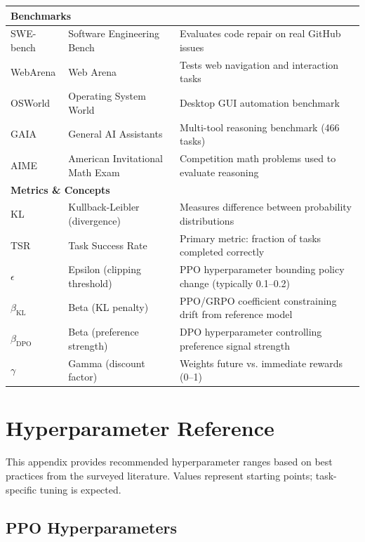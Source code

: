 \documentclass[12pt,a4paper]{report}
\theoremstyle{definition}
\begin{document}
\begin{longtable}{@{}p{2.5cm}p{5cm}p{7cm}@{}}
\multicolumn{3}{l}{\textbf{Benchmarks}} \\
\midrule
SWE-bench & Software Engineering Bench & Evaluates code repair on real GitHub issues \\
WebArena & Web Arena & Tests web navigation and interaction tasks \\
OSWorld & Operating System World & Desktop GUI automation benchmark \\
GAIA & General AI Assistants & Multi-tool reasoning benchmark (466 tasks) \\
AIME & American Invitational Math Exam & Competition math problems used to evaluate reasoning \\
\midrule

\multicolumn{3}{l}{\textbf{Metrics \& Concepts}} \\
\midrule
KL & Kullback-Leibler (divergence) & Measures difference between probability distributions \\
TSR & Task Success Rate & Primary metric: fraction of tasks completed correctly \\
$\epsilon$ & Epsilon (clipping threshold) & PPO hyperparameter bounding policy change (typically 0.1--0.2) \\
$\beta_{\text{KL}}$ & Beta (KL penalty) & PPO/GRPO coefficient constraining drift from reference model \\
$\beta_{\text{DPO}}$ & Beta (preference strength) & DPO hyperparameter controlling preference signal strength \\
$\gamma$ & Gamma (discount factor) & Weights future vs. immediate rewards (0--1) \\
\end{longtable}



\chapter{Hyperparameter Reference}
\label{app:hyperparams}

This appendix provides recommended hyperparameter ranges based on best practices from the surveyed literature. Values represent starting points; task-specific tuning is expected.

\section{PPO Hyperparameters}
\end{document}
